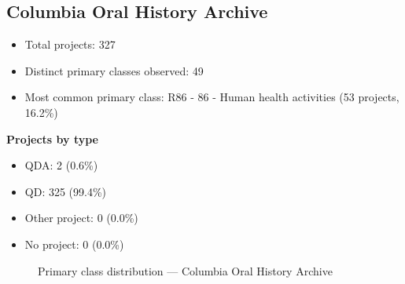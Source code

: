 \subsection{Columbia Oral History Archive}

\begin{itemize}
    \item Total projects: 327
    \item Distinct primary classes observed: 49
    \item Most common primary class: R86 - 86 - Human health activities (53 projects, 16.2\%)
\end{itemize}
\textbf{Projects by type}
\begin{itemize}
    \item QDA: 2 (0.6\%)
    \item QD: 325 (99.4\%)
    \item Other project: 0 (0.0\%)
    \item No project: 0 (0.0\%)
\end{itemize}

\begin{figure}[h]
    \centering
    
    \caption{Primary class distribution --- Columbia Oral History Archive}
\end{figure}

